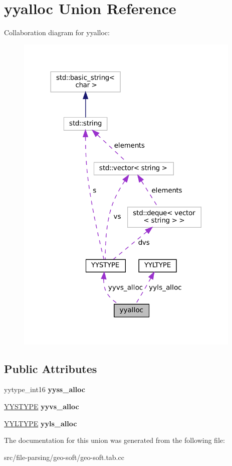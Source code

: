 \hypertarget{unionyyalloc}{}\section{yyalloc Union Reference}
\label{unionyyalloc}


Collaboration diagram for yyalloc\+:\nopagebreak
\begin{figure}[H]
\begin{center}
\leavevmode
\includegraphics[width=305pt]{unionyyalloc__coll__graph}
\end{center}
\end{figure}
\subsection*{Public Attributes}
\begin{DoxyCompactItemize}
\item 
\mbox{\label{unionyyalloc_a4800e0520a89a4789afa7b5d82197e65}} 
yytype\+\_\+int16 {\bfseries yyss\+\_\+alloc}
\item 
\mbox{\label{unionyyalloc_a9326f4fdc6f737a929444427836d8928}} 
\mbox{\hyperlink{unionYYSTYPE}{Y\+Y\+S\+T\+Y\+PE}} {\bfseries yyvs\+\_\+alloc}
\item 
\mbox{\label{unionyyalloc_a542e43248e6afac9af342c2f4e3162fc}} 
\mbox{\hyperlink{structYYLTYPE}{Y\+Y\+L\+T\+Y\+PE}} {\bfseries yyls\+\_\+alloc}
\end{DoxyCompactItemize}


The documentation for this union was generated from the following file\+:\begin{DoxyCompactItemize}
\item 
src/file-\/parsing/geo-\/soft/geo-\/soft.\+tab.\+cc\end{DoxyCompactItemize}
